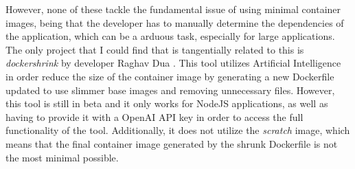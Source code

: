 However, none of these tackle the fundamental issue of using minimal container images,
being that the developer has to manually determine the dependencies of the application,
which can be a arduous task, especially for large applications. The only project that I could find 
that is tangentially related to this is \textit{dockershrink} by developer Raghav Dua \cite{dockershrink}.
This tool utilizes Artificial Intelligence in order reduce the size of the container image by generating a new
Dockerfile updated to use slimmer base images and removing unnecessary files. \cite{dockershrink}
However, this tool is still in beta and it only works for NodeJS applications, as well as having to
provide it with a OpenAI API key in order to access the full functionality of the tool.
Additionally, it does not utilize the \textit{scratch} image, which means that the final 
container image generated by the shrunk Dockerfile is not the most minimal possible.

 